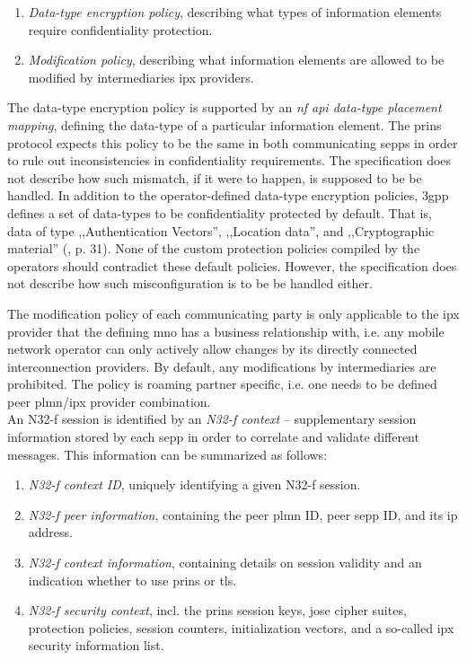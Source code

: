 \begin{enumerate}[label=--]
    \item \textit{Data-type encryption policy}, describing what types of information elements require confidentiality protection.
    \item \textit{Modification policy}, describing what information elements are allowed to be modified by intermediaries \gls{ipx} providers.
\end{enumerate}

The data-type encryption policy is supported by an \textit{\gls{nf} \gls{api} data-type placement mapping}, defining the data-type of a particular information element.
The \gls{prins} protocol expects this policy to be the same in both communicating \glspl{sepp} in order to rule out inconsistencies in confidentiality requirements.
The specification does not describe how such mismatch, if it were to happen, is supposed to be be handled.
In addition to the operator-defined data-type encryption policies, \gls{3gpp} defines a set of data-types to be confidentiality protected by default.
That is, data of type ,,Authentication Vectors'', ,,Location data'', and ,,Cryptographic material'' (\cite{3gpp.33.501}, p. 31).
None of the custom protection policies compiled by the operators should contradict these default policies.
However, the specification does not describe how such misconfiguration is to be be handled either.

The modification policy of each communicating party is only applicable to the \gls{ipx} provider that the defining \gls{mno} has a business relationship with, i.e. any mobile network operator can only actively allow changes by its directly connected interconnection providers.
By default, any modifications by intermediaries are prohibited.
The policy is roaming partner specific, i.e. one needs to be defined peer \gls{plmn}/\gls{ipx} provider combination.
\\

An N32-f session is identified by an \textit{N32-f context} -- supplementary session information stored by each \gls{sepp} in order to correlate and validate different messages.
This information can be summarized as follows:

\begin{enumerate}[label=--]
    \item \textit{N32-f context ID}, uniquely identifying a given N32-f session.
    \item \textit{N32-f peer information}, containing the peer \gls{plmn} ID, peer \gls{sepp} ID, and its \gls{ip} address.
    \item \textit{N32-f context information}, containing details on session validity and an indication whether to use \gls{prins} or \gls{tls}.
    \item \textit{N32-f security context}, incl. the \gls{prins} session keys, \gls{jose} cipher suites, protection policies, session counters, initialization vectors, and a so-called \gls{ipx} security information list.
\end{enumerate}

